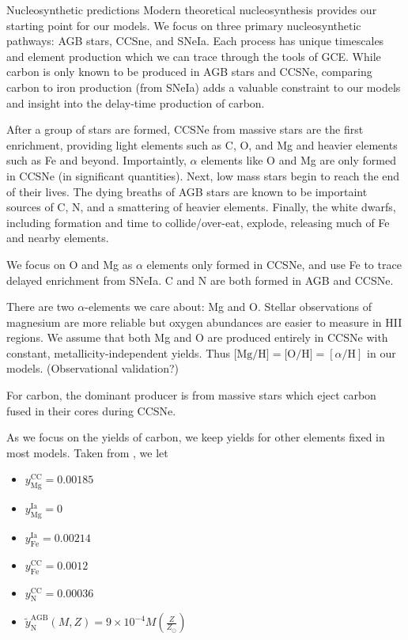 \documentclass[12pt,oneside]{report}
\begin{document}
Nucleosynthetic predictions 
Modern theoretical nucleosynthesis provides our starting point for our models.  We focus on three primary nucleosynthetic pathways: AGB stars, CCSne, and SNeIa. Each process has unique timescales and element production which we can trace through the tools of GCE. While carbon is only known to be produced in AGB stars and CCSNe, comparing carbon to iron production (from SNeIa) adds a valuable constraint to our models and insight into the delay-time production of carbon.

After a group of stars are formed, CCSNe from massive stars are the first enrichment, providing light elements such as C, O, and Mg and heavier elements such as Fe and beyond. Importaintly, $\alpha$ elements like O and Mg are only formed in CCSNe (in significant quantities). Next, low mass stars begin to reach the end of their lives. The dying breaths of AGB stars are known to be importaint sources of C, N, and a smattering of heavier elements.  Finally, the white dwarfs, including formation and time to collide/over-eat, explode, releasing much of Fe and nearby elements. 

We focus on O and Mg as $\alpha$ elements only formed in CCSNe, and use Fe to
trace delayed enrichment from SNeIa. C and N are both formed in AGB and CCSNe.

There are two $\alpha$-elements we care about: Mg and O. Stellar observations
of magnesium are more reliable but oxygen abundances are easier to measure in
HII regions. We assume that both Mg and O are produced entirely in CCSNe with
constant, metallicity-independent yields. Thus $\text{[Mg/H]} = \text{[O/H]} =
[\alpha/\text{H}]$ in our models. (Observational validation?)

For carbon, the dominant producer is from massive stars which eject carbon fused in their cores during CCSNe. 

As we focus on the yields of carbon, we keep yields for other elements fixed in
most models. Taken from \citet{james+21, james+22}, we let
\begin{itemize}
    \item $y_\text{Mg}^\text{CC} = 0.00185$
    \item $y_\text{Mg}^\text{Ia} = 0$
    \item $y_\text{Fe}^\text{Ia} = 0.00214$
    \item $y_\text{Fe}^\text{CC} = 0.0012$
    \item $y_\text{N}^\text{CC} = 0.00036$
    \item $\tilde{y}_\text{N}^\text{AGB}(M, Z) = 9\times 10^{-4} M \left(\frac{Z}{Z_\odot}\right)$
\end{itemize}
\end{document}
